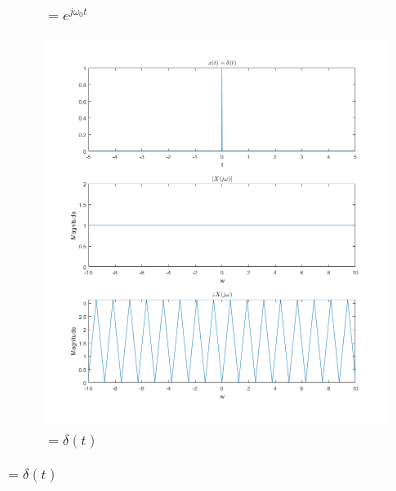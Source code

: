 \documentclass[11pt]{article}
\begin{document}
\begin{figure}
\begin{subfigure}[b]{.3\linewidth}
\caption{$ = e^{j\omega _{0}t}$}
\end{subfigure}
\begin{subfigure}[b]{.3\linewidth}
\includegraphics[width=\linewidth]{q2c}
\caption{$ = \delta (t)$}
\end{subfigure}


\end{figure}
\end{document}
